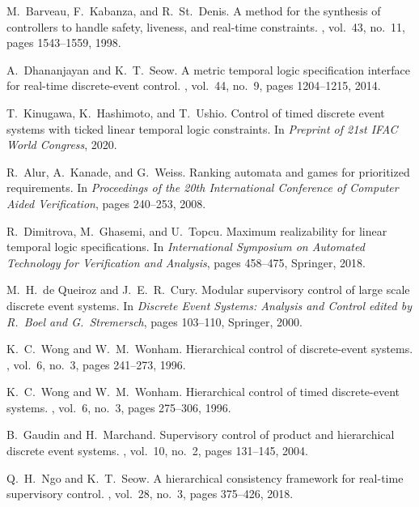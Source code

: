 \documentclass{article}
\begin{document}
\begin{thebibliography}{99}
M.~Barveau, F.~Kabanza, and R.~St.~Denis.
\newblock A method for the synthesis of controllers to handle safety, liveness, and real-time constraints.
, vol.~43, no.~11, pages 1543--1559, 1998.

%
A.~Dhananjayan and K.~T.~Seow.
\newblock A metric temporal logic specification interface for real-time discrete-event control.
, vol.~44, no.~9, pages 1204--1215, 2014.

%
T.~Kinugawa, K.~Hashimoto, and T.~Ushio.
\newblock Control of timed discrete event systems with ticked linear temporal logic constraints.
\newblock In {\em Preprint of 21st IFAC World Congress}, 2020.

%
R.~Alur, A.~Kanade, and G.~Weiss.
\newblock Ranking automata and games for prioritized requirements.
\newblock In {\em Proceedings of the 20th International Conference of Computer Aided Verification}, pages 240--253, 2008.

%
R.~Dimitrova, M.~Ghasemi, and U.~Topcu.
\newblock Maximum realizability for linear temporal logic specifications.
\newblock In {\em International Symposium on Automated Technology for Verification and Analysis}, pages 458--475, Springer, 2018.

%
M.~H.~de Queiroz and J.~E.~R.~Cury.
\newblock Modular supervisory control of large scale discrete event systems.
\newblock In {\em Discrete Event Systems:  Analysis and Control edited by R.\ Boel and G.\ Stremersch}, pages 103--110, Springer, 2000.

%
K.~C.~Wong and W.~M.~Wonham.
\newblock Hierarchical control of discrete-event systems.
, vol.~6, no.~3, pages 241--273, 1996.

%
K.~C.~Wong and W.~M.~Wonham.
\newblock Hierarchical control of timed discrete-event systems.
, vol.~6, no.~3, pages 275--306, 1996.

B.~Gaudin and H.~Marchand.
\newblock Supervisory control of product and hierarchical discrete event systems.
, vol.~10, no.~2, pages 131--145, 2004.

%
Q.~H.~Ngo and K.~T.~Seow.
\newblock A hierarchical consistency framework for real-time supervisory control.
, vol.~28, no.~3, pages 375--426, 2018.


\end{thebibliography}
\end{document}
